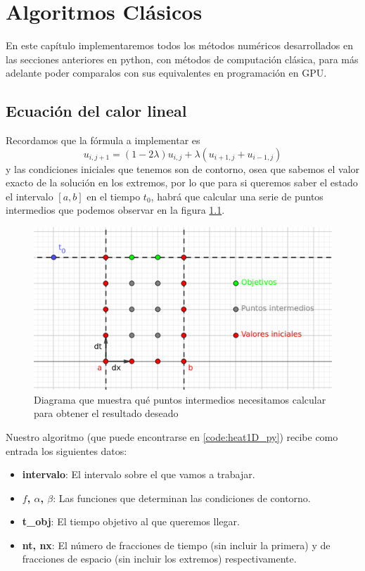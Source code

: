 \chapter{Algoritmos Clásicos}\label{chap:alg_clas}
\begin{resumen}
	En este capítulo implementaremos todos los métodos numéricos desarrollados en las secciones anteriores en python, con métodos de computación clásica, para más adelante poder comparalos con sus equivalentes en programación en GPU.
\end{resumen}

\section{Ecuación del calor lineal}
Recordamos que la fórmula a implementar es 
\begin{equation*}
	u_{i,j+1}=(1-2\lambda)u_{i,j} + \lambda(u_{i+1,j}+u_{i-1,j})
\end{equation*}
y las condiciones iniciales que tenemos son de contorno, osea que sabemos el valor exacto de la solución en los extremos, por lo que para si queremos saber el estado el intervalo $[a,b]$ en el tiempo $t_0$, habrá que calcular una serie de puntos intermedios que podemos observar en la figura \ref{fig:1dheatpoints}.

\begin{figure}
	\includegraphics[width=\linewidth]{Imagenes/Bitmap/1dheatpoints.png}
	\caption[Puntos ecuación del calor lineal]{Diagrama que muestra qué puntos intermedios necesitamos calcular para obtener el resultado deseado}
	\label{fig:1dheatpoints}
\end{figure}

Nuestro algoritmo (que puede encontrarse en \ref{code:heat1D_py}) recibe como entrada los siguientes datos:
\begin{itemize}[label=$\bullet$]
	\item \textbf{intervalo}: El intervalo sobre el que vamos a trabajar.
	\item \textbf{$f$, $\alpha$, $\beta$}: Las funciones que determinan las condiciones de contorno.
	\item \textbf{t\_obj}: El tiempo objetivo al que queremos llegar.
	\item \textbf{nt, nx}: El número de fracciones de tiempo (sin incluir la primera) y de fracciones de espacio (sin incluir los extremos) respectivamente.
\end{itemize}

